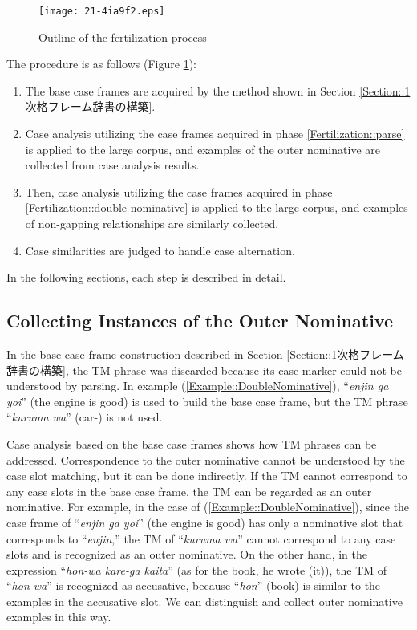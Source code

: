 \documentclass[english]{jnlp_1.4_rep}
\newcommand{\TOP}{}
\begin{document}
\begin{figure}[b]
 \begin{center}
  \texttt{[image: 21-4ia9f2.eps]}
 \end{center}
  \caption{Outline of the fertilization process}
  \label{Figure::Outline}
\end{figure}

The procedure is as follows (Figure \ref{Figure::Outline}):

\begin{enumerate}
 \item The base case frames are acquired by the method shown in
       Section \ref{Section::1次格フレーム辞書の構築}. \label{Fertilization::parse}
 \item Case analysis utilizing the case frames acquired in phase
       \ref{Fertilization::parse} is applied to the large corpus, and
       examples of the outer nominative are collected from case analysis
       results. \label{Fertilization::double-nominative}
 \item Then, case analysis utilizing the case frames acquired in phase
       \ref{Fertilization::double-nominative} is applied to the large
       corpus, and examples of non-gapping relationships are similarly collected.
 \item Case similarities are judged to handle case alternation.
\end{enumerate}

In the following sections, each step is described in detail.


\subsection{Collecting Instances of the Outer Nominative}

In the base case frame construction described in Section
\ref{Section::1次格フレーム辞書の構築}, the TM phrase was discarded because
its case marker could not be understood by parsing. In example
(\ref{Example::DoubleNominative}), ``\textit{enjin ga yoi}'' (the engine
is good) is used to build the base case frame, but the TM phrase
``\textit{kuruma wa}'' (car-\TOP) is not used.

Case analysis based on the base case frames shows how 
TM phrases can be addressed. Correspondence to the outer nominative cannot be understood by
the case slot matching, but it can be done indirectly. If the TM cannot correspond to
any case slots in the base case frame, the TM can be regarded as
an outer nominative. For example, in the case of
(\ref{Example::DoubleNominative}), since the case frame of
``\textit{enjin ga yoi}'' (the engine is good) has only a nominative
slot that corresponds to ``\textit{enjin},'' the TM of ``\textit{kuruma
wa}'' cannot correspond to any case slots and is recognized as an outer
nominative. On the other hand, in the expression ``\textit{hon-wa
kare-ga kaita}'' (as for the book, he wrote (it)), 
the TM of ``\textit{hon wa}'' is recognized as accusative, because
``\textit{hon}'' (book) is similar to the examples in the accusative
slot. We can distinguish and collect outer nominative examples in this
way.
\end{document}
